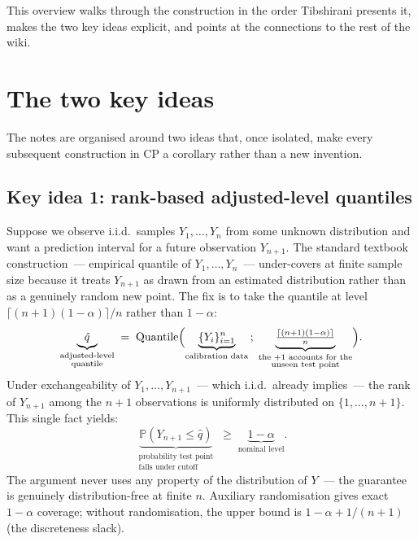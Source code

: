 \documentclass[letterpaper,11pt,leqno]{article}
\begin{document}
This overview walks through the construction in the order Tibshirani presents it, makes the two key ideas explicit, and points at the connections to the rest of the wiki.

\section{The two key ideas}\label{s:keyideas}

The notes are organised around two ideas that, once isolated, make every subsequent construction in CP a corollary rather than a new invention.

\subsection*{Key idea 1: rank-based adjusted-level quantiles}

Suppose we observe i.i.d.\ samples $Y_1, \dots, Y_n$ from some unknown distribution and want a prediction interval for a future observation $Y_{n+1}$. The standard textbook construction~--- empirical quantile of $Y_1, \dots, Y_n$~--- under-covers at finite sample size because it treats $Y_{n+1}$ as drawn from an estimated distribution rather than as a genuinely random new point. The fix is to take the quantile at level $\lceil(n+1)(1-\alpha)\rceil / n$ rather than $1 - \alpha$:
\begin{equation*}
\underbrace{\hat{q}}_{\substack{\text{adjusted-level}\\\text{quantile}}}
\;=\;
\text{Quantile}\Bigl(
\underbrace{\{Y_i\}_{i=1}^{n}}_{\text{calibration data}}
\,;\;
\underbrace{\tfrac{\lceil (n+1)(1-\alpha)\rceil}{n}}_{\substack{\text{the }+1\text{ accounts for the}\\\text{unseen test point}}}
\Bigr).
\end{equation*}
Under exchangeability of $Y_1, \dots, Y_{n+1}$~--- which i.i.d.\ already implies~--- the rank of $Y_{n+1}$ among the $n+1$ observations is uniformly distributed on $\{1, \dots, n+1\}$. This single fact yields:
\begin{equation*}
\underbrace{\mathbb{P}(Y_{n+1} \leq \hat{q})}_{\substack{\text{probability test point}\\\text{falls under cutoff}}}
\;\geq\;
\underbrace{1 - \alpha}_{\text{nominal level}}.
\end{equation*}
The argument never uses any property of the distribution of $Y$~--- the guarantee is genuinely distribution-free at finite $n$. Auxiliary randomisation gives exact $1 - \alpha$ coverage; without randomisation, the upper bound is $1 - \alpha + 1/(n+1)$ (the discreteness slack).
\end{document}
